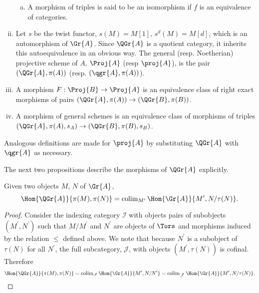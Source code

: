 \documentclass[10pt]{amsart}
\begin{document}
\begin{defn}
\begin{enumerate}[(i)]
\begin{enumerate}[(a)]
    \item
      A morphism of triples is said to be an isomorphism if $f$ is an equivalence of categories.
    \end{enumerate}
  \item
    Let $s$ be the twist functor, $s(M) = M[1]$, $s^d(M) = M[d]$, which is an automorphism of $\Gr{A}$.
    Since $\QGr{A}$ is a quotient category, it inherits this autoequivalence in an obvious way.
    The general (resp. Noetherian) projective scheme of $A$, $\Proj{A}$ (resp $\proj{A}$), is the pair $(\QGr{A}, \pi(A))$ (resp. $(\qgr{A}, \pi(A))$).
  \item
    A morphism $F :\Proj{B} \rightarrow \Proj{A}$ is an equivalence class of right exact morphisms of pairs $(\QGr{A}, \pi(A)) \rightarrow (\QGr{B}, \pi(B))$.
  \item
    A morphism of general schemes is an equivalence class of morphisms of triples $(\QGr{A}, \pi(A), s_A) \rightarrow (\QGr{B}, \pi(B), s_B)$.
  \end{enumerate}
  Analogous definitions are made for $\proj{A}$ by substituting $\QGr{A}$ with $\qgr{A}$ as necessary.
\end{defn}

The next two propositions describe the morphisms of $\QGr{A}$ explicitly.

\begin{prop}
  Given two objects $M$, $N$ of $\Gr{A}$, 
  $$\Hom{\QGr{A}}{\pi(M), \pi(N)} = \operatorname{colim}_{M^\prime}\Hom{\Gr{A}}{M^\prime, N/\tau(N)}.$$
  
  \begin{proof}
    Consider the indexing category $\mathscr{I}$ with objects pairs of subobjects $(M^\prime, N^\prime)$ such that $M/M^\prime$ and $N^\prime$ are objects of $\Tors$ and morphisms induced by the relation $\leq$ defined above.
    We note that because $N^\prime$ is a subobject of $\tau(N)$ for all $N^\prime$, the full subcategory, $\mathscr{J}$, with objects $(M^\prime, \tau(N))$ is cofinal.
    Therefore
    $$\Hom{\QGr{A}}{\pi(M), \pi(N)} = \operatorname{colim}_{\mathscr{I}}\Hom{\Gr{A}}{M^\prime, N/N^\prime} = \operatorname{colim}_{\mathscr{J}}\Hom{\Gr{A}}{M^\prime, N/\tau(N)}.$$
  \end{proof}
\end{prop}
\end{document}
